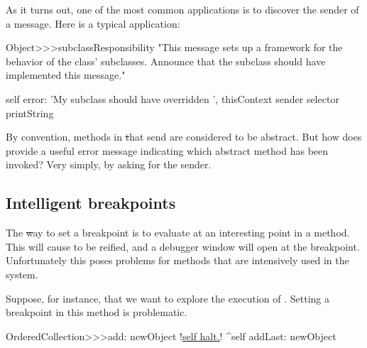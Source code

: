 \documentclass[a4paper,10pt,twoside]{book}
\begin{document}
As it turns out, one of the most common applications is to discover the sender of a message.
Here is a typical application:

\begin{code}{}
Object>>>subclassResponsibility
	"This message sets up a framework for the behavior of the class' subclasses.
	Announce that the subclass should have implemented this message."

	self error: 'My subclass should have overridden ', thisContext sender selector printString
\end{code}

By convention, methods in \st that send  are considered to be abstract.  But how does  provide a useful error message indicating which abstract method has been invoked?  Very simply, by asking  for the sender.

\subsection{Intelligent breakpoints}

The \st way to set a breakpoint is to evaluate  at an interesting point in a method.  This will cause  to be reified, and a debugger window will open at the breakpoint.
Unfortunately this poses problems for methods that are intensively used in the system.

Suppose, for instance, that we want to explore the execution of .
Setting a breakpoint in this method is problematic.

\begin{code}{}
OrderedCollection>>>add: newObject
	!\underline{self halt.}!
	^self addLast: newObject
\end{code}
\end{document}
